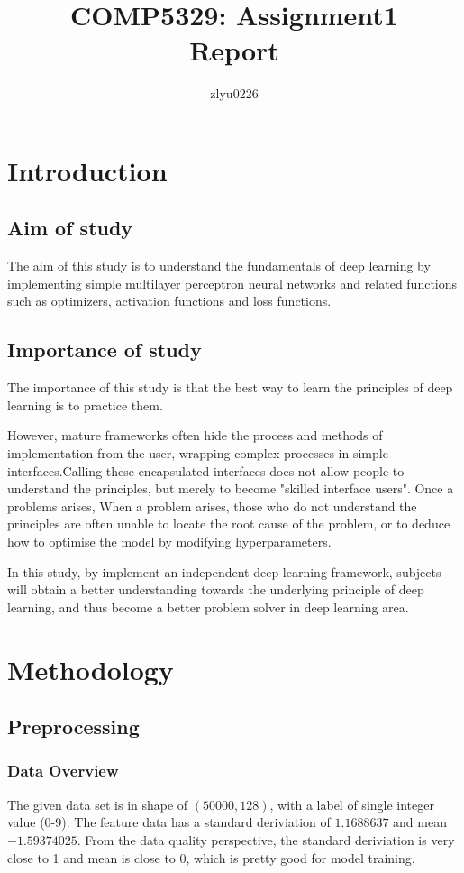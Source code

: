 \documentclass{article}[12pt]
\author{zlyu0226}
\title{COMP5329: Assignment1\\Report}
\begin{document}
\maketitle

\section{Introduction}\label{sec:introduction}
\subsection{Aim of study}\label{subsec:aim-of-study}
    The aim of this study is to understand the fundamentals of deep learning by implementing
    simple multilayer perceptron neural networks and related functions such as optimizers,
    activation functions and loss functions.
\subsection{Importance of study}\label{subsec:importance-of-study}
    The importance of this study is that the best way to learn the principles of deep
    learning is to practice them.

    However, mature frameworks often hide the process and methods of implementation
    from the user, wrapping complex processes in simple interfaces.Calling these
    encapsulated interfaces does not allow people to understand the principles,
    but merely to become "skilled interface users".
    Once a problems arises, When a problem arises, those who do not understand
    the principles are often unable to locate the root cause of the problem,
    or to deduce how to optimise the model by modifying hyperparameters.

    In this study, by implement an independent deep learning framework, subjects will obtain a
    better understanding towards the underlying principle of deep learning, and thus become a better
    problem solver in deep learning area.

\section{Methodology}\label{sec:methodology}
\subsection{Preprocessing}\label{subsec:preprocessing}
\subsubsection{Data Overview}\label{subsubsec:data-overview}
    The given data set is in shape of $(50000, 128)$, with a label of single integer value (0-9).
    The feature data has a standard deriviation of $1.1688637$ and mean $-1.59374025$.
    From the data quality perspective, the standard deriviation is very close to 1 and mean is close to 0,
    which is pretty good for model training.
\end{document}
